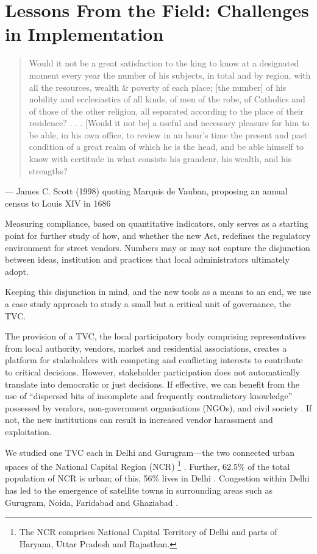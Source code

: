 \documentclass[a4paper, 12pt, twoside]{article}
\begin{document}
\section{Lessons From the Field: Challenges in Implementation}
\begin{quote}
Would it not be a great satisfaction to the king to know at a designated moment every year the number of his subjects, in total and by region, with all the resources, wealth \& poverty of each place; [the number] of his nobility and ecclesiastics of all kinds, of men of the robe, of Catholics and of those of the other religion, all separated according to the place of their residence? . . . [Would it not be] a useful and necessary pleasure for him to be able, in his own office, to review in an hour’s time the present and past condition of a great realm of which he is the head, and be able himself to know with certitude in what consists his grandeur, his wealth, and his strengths? 
\end{quote}
— James C. Scott (1998) \cite{scottbook} quoting Marquis de Vauban, proposing an annual census to Louis XIV in 1686 

Measuring compliance, based on quantitative indicators, only serves as a starting point for further study of how, and whether the new Act, redefines the regulatory environment for street vendors. Numbers may or may not capture the disjunction between ideas, institution and practices that local administrators ultimately adopt. 

Keeping this disjunction in mind, and the new tools as a means to an end, we use a case study approach to study a small but a critical unit of governance, the TVC.  

The provision of a TVC, the local participatory body comprising representatives from local authority, vendors, market and residential associations, creates a platform for stakeholders with competing and conflicting interests to contribute to critical decisions. However, stakeholder participation does not automatically translate into democratic or just decisions. If effective, we can benefit from the use of “dispersed bits of incomplete and frequently contradictory knowledge” possessed by vendors, non-government organisations (NGOs), and civil society \cite{hayekpaper}. If not, the new institutions can result in increased vendor harassment and exploitation.  

We studied one TVC each in Delhi and Gurugram—the two connected urban spaces of the National Capital Region (NCR) \footnote{The NCR comprises National Capital Territory of Delhi and parts of Haryana, Uttar Pradesh and Rajasthan.}
. Further, 62.5\% of the total population of NCR is urban; of this, 56\% lives in Delhi \cite{ncrpbreport}. Congestion within Delhi has led to the emergence of satellite towns in surrounding areas such as Gurugram, Noida, Faridabad and Ghaziabad \cite{kpmgreport}. 
\end{document}
